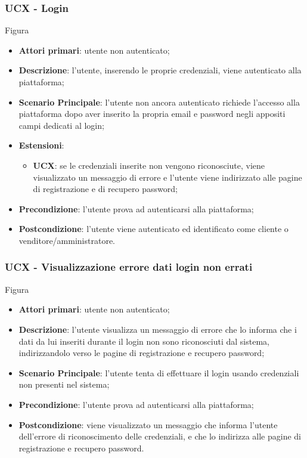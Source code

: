 \subsubsection{UCX - Login}
Figura \\
\begin{itemize}
\item \textbf{Attori primari}: utente non autenticato;
\item \textbf{Descrizione}: l'utente, inserendo le proprie credenziali, viene autenticato alla piattaforma;
\item \textbf{Scenario Principale}: l'utente non ancora autenticato richiede l'accesso alla piattaforma dopo aver inserito la propria email e password negli appositi campi dedicati al login;
\item \textbf{Estensioni}:
\begin{itemize}
\item \textbf{UCX}: se le credenziali inserite non vengono riconosciute, viene visualizzato un messaggio di errore e l'utente viene indirizzato alle pagine di registrazione e di recupero password;
\end{itemize}
\item \textbf{Precondizione}: l'utente prova ad autenticarsi alla piattaforma;
\item \textbf{Postcondizione}: l'utente viene autenticato ed identificato come cliente o venditore/amministratore.
\end{itemize}

\subsubsection{UCX - Visualizzazione errore dati login non errati}
Figura \\
\begin{itemize}
\item \textbf{Attori primari}: utente non autenticato;
\item \textbf{Descrizione}: l'utente visualizza un messaggio di errore che lo informa che i dati da lui inseriti durante il login non sono riconosciuti dal sistema, indirizzandolo verso le pagine di registrazione e recupero password;
\item \textbf{Scenario Principale}: l'utente tenta di effettuare il login usando credenziali non presenti nel sistema;
\item \textbf{Precondizione}: l'utente prova ad autenticarsi alla piattaforma;
\item \textbf{Postcondizione}: viene visualizzato un messaggio che informa l'utente dell'errore di riconoscimento delle credenziali, e che lo indirizza alle pagine di registrazione e recupero password.
\end{itemize}